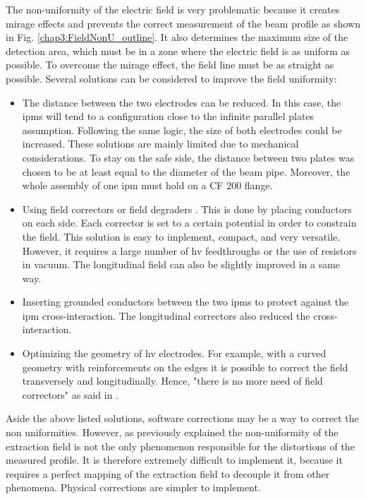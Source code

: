 \begin{refsection}
  The non-uniformity of the electric field is very problematic because it creates mirage effects and prevents the correct measurement of the beam profile as shown in Fig. \ref{chap3:FieldNonU_outline}. It also determines the maximum size of the detection area, which must be in a zone where the electric field is as uniform as possible. To overcome the mirage effect, the field line must be as straight as possible. Several solutions can be considered to improve the field uniformity:
  \begin{itemize}
    \item The distance between the two electrodes can be reduced. In this case, the \acrshort{ipm}s will tend to a configuration close to the infinite parallel plates assumption. Following the same logic, the size of both electrodes could be increased. These solutions are mainly limited due to mechanical considerations. To stay on the safe side, the distance between two plates was chosen to be at least equal to the diameter of the beam pipe. Moreover, the whole assembly of one \acrshort{ipm} must hold on a CF 200 flange.
    \item Using field correctors or field degraders \cite[p. 103]{egber2012}. This is done by placing conductors on each side. Each corrector is set to a certain potential in order to constrain the field. This solution is easy to implement, compact, and very versatile. However, it requires a large number of \acrshort{hv} feedthroughs or the use of resistors in vacuum. The longitudinal field can also be slightly improved in a same way.
    \item Inserting grounded conductors between the two \acrshort{ipm}s \cite[p. 132]{egber2012} to protect against the \acrshort{ipm} cross-interaction. The longitudinal correctors also reduced the cross-interaction.
    \item Optimizing the geometry of \acrshort{hv} electrodes. For example, with a curved geometry with reinforcements on the edges it is possible to correct the field transversely and longitudinally. Hence, "there is no more need of field correctors" as said in \cite{Bartkoski2014}.
  \end{itemize}
  Aside the above listed solutions, software corrections may be a way to correct the non uniformities. However, as previously explained the non-uniformity of the extraction field is not the only phenomenon responsible for the distortions of the measured profile. It is therefore extremely difficult to implement it, because it requires a perfect mapping of the extraction field to decouple it from other phenomena. Physical corrections are simpler to implement.


\end{refsection}
